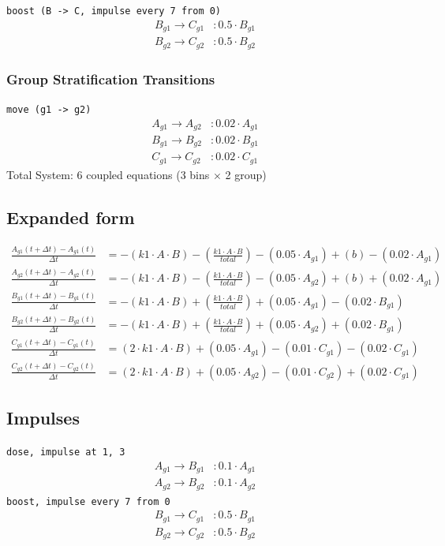 \documentclass{article}
\begin{document}
\noindent\texttt{boost (B -\textgreater{} C, impulse every 7 from 0)}
\begin{align*}
B_{g1} \to C_{g1} &: 0.5 \cdot B_{g1} \\
B_{g2} \to C_{g2} &: 0.5 \cdot B_{g2}
\end{align*}
\subsubsection*{Group Stratification Transitions}
\noindent\texttt{move (g1 -\textgreater{} g2)}
\begin{align*}
A_{g1} \to A_{g2} &: 0.02 \cdot A_{g1} \\
B_{g1} \to B_{g2} &: 0.02 \cdot B_{g1} \\
C_{g1} \to C_{g2} &: 0.02 \cdot C_{g1}
\end{align*}
Total System: 6 coupled equations (3 bins $\times$ 2 group)

\subsection*{Expanded form}
\begin{align*}
\frac{A_{g1}(t+\Delta t) - A_{g1}(t)}{\Delta t} &= - (k1 \cdot A \cdot B) - (\frac{k1 \cdot A \cdot B}{total}) - (0.05 \cdot A_{g1}) + (b) - (0.02 \cdot A_{g1}) \\
\frac{A_{g2}(t+\Delta t) - A_{g2}(t)}{\Delta t} &= - (k1 \cdot A \cdot B) - (\frac{k1 \cdot A \cdot B}{total}) - (0.05 \cdot A_{g2}) + (b) + (0.02 \cdot A_{g1}) \\
\frac{B_{g1}(t+\Delta t) - B_{g1}(t)}{\Delta t} &= - (k1 \cdot A \cdot B) + (\frac{k1 \cdot A \cdot B}{total}) + (0.05 \cdot A_{g1}) - (0.02 \cdot B_{g1}) \\
\frac{B_{g2}(t+\Delta t) - B_{g2}(t)}{\Delta t} &= - (k1 \cdot A \cdot B) + (\frac{k1 \cdot A \cdot B}{total}) + (0.05 \cdot A_{g2}) + (0.02 \cdot B_{g1}) \\
\frac{C_{g1}(t+\Delta t) - C_{g1}(t)}{\Delta t} &= (2 \cdot k1 \cdot A \cdot B) + (0.05 \cdot A_{g1}) - (0.01 \cdot C_{g1}) - (0.02 \cdot C_{g1}) \\
\frac{C_{g2}(t+\Delta t) - C_{g2}(t)}{\Delta t} &= (2 \cdot k1 \cdot A \cdot B) + (0.05 \cdot A_{g2}) - (0.01 \cdot C_{g2}) + (0.02 \cdot C_{g1})
\end{align*}
\subsection*{Impulses}
\noindent\texttt{dose, impulse at 1, 3}
\begin{align*}
A_{g1} \to B_{g1} &: 0.1 \cdot A_{g1} \\
A_{g2} \to B_{g2} &: 0.1 \cdot A_{g2}
\end{align*}
\noindent\texttt{boost, impulse every 7 from 0}
\begin{align*}
B_{g1} \to C_{g1} &: 0.5 \cdot B_{g1} \\
B_{g2} \to C_{g2} &: 0.5 \cdot B_{g2}
\end{align*}
\end{document}

